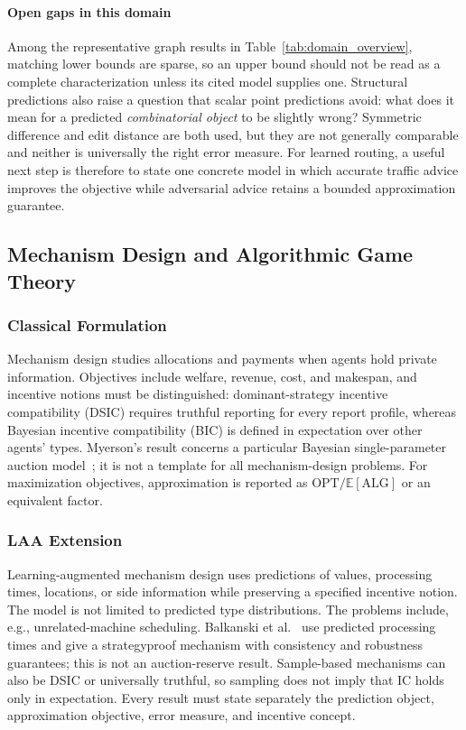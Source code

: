 \documentclass[acmsmall,screen,nonacm]{acmart}
\theoremstyle{acmdefinition}%
\begin{document}
\paragraph*{Open gaps in this domain}
Among the representative graph results in Table~\ref{tab:domain_overview}, matching lower bounds are sparse, so an upper bound should not be read as a complete characterization unless its cited model supplies one. Structural predictions also raise a question that scalar point predictions avoid: what does it mean for a predicted \emph{combinatorial object} to be slightly wrong? Symmetric difference and edit distance are both used, but they are not generally comparable and neither is universally the right error measure. For learned routing, a useful next step is therefore to state one concrete model in which accurate traffic advice improves the objective while adversarial advice retains a bounded approximation guarantee.

\subsection{Mechanism Design and Algorithmic Game Theory}
\label{subsec:mech_design}

\subsubsection{Classical Formulation}
Mechanism design studies allocations and payments when agents hold private information. Objectives include welfare, revenue, cost, and makespan, and incentive notions must be distinguished: dominant-strategy incentive compatibility (DSIC) requires truthful reporting for every report profile, whereas Bayesian incentive compatibility (BIC) is defined in expectation over other agents' types. Myerson's result concerns a particular Bayesian single-parameter auction model~\cite{myerson1981optimal}; it is not a template for all mechanism-design problems. For maximization objectives, approximation is reported as $\mathrm{OPT}/\mathbb E[\mathrm{ALG}]$ or an equivalent factor.

\subsubsection{LAA Extension}
Learning-augmented mechanism design uses predictions of values, processing times, locations, or side information while preserving a specified incentive notion. The model is not limited to predicted type distributions. The problems include, e.g., unrelated-machine scheduling. Balkanski et al.~\cite{balkanski2023strategyproof} use predicted processing times and give a strategyproof mechanism with consistency and robustness guarantees; this is not an auction-reserve result. Sample-based mechanisms can also be DSIC or universally truthful, so sampling does not imply that IC holds only in expectation. Every result must state separately the prediction object, approximation objective, error measure, and incentive concept.
\end{document}
